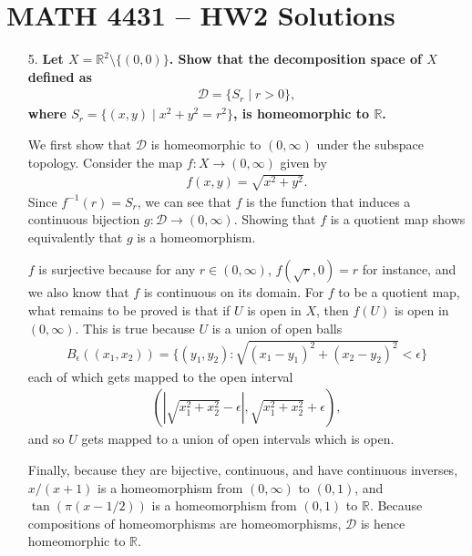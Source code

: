\documentclass[a4paper,12pt]{article}
\begin{document}
\section*{MATH 4431 -- HW2 Solutions}
\begin{enumerate}
    \item[5.]
        \boldmath\textbf{Let $X = \mathbb{R}^2 \setminus \{ (0, 0) \}$. Show that the decomposition space of $X$ defined as
            \begin{align*}
                \mathcal{D} = \{ S_r \mid r > 0 \},
            \end{align*}
            where $S_r = \{ (x, y) \mid x^2 + y^2 = r^2 \}$, is homeomorphic to $\mathbb{R}$.
        }\unboldmath \par
        We first show that $\mathcal{D}$ is homeomorphic to $(0, \infty)$ under the subspace topology. Consider the map $f : X \to (0, \infty)$ given by
        \begin{align*}
            f(x, y) = \sqrt{x^2 + y^2}.
        \end{align*}
        Since $f^{-1}(r) = S_r$, we can see that $f$ is the function that induces a continuous bijection $g : \mathcal{D} \to (0, \infty)$. Showing that $f$ is a quotient map shows equivalently that $g$ is a homeomorphism. \par 
        $f$ is surjective because for any $r \in (0, \infty)$, $f(\sqrt{r}, 0) = r$ for instance, and we also know that $f$ is continuous on its domain. For $f$ to be a quotient map, what remains to be proved is that if $U$ is open in $X$, then $f(U)$ is open in $(0, \infty)$. This is true because $U$ is a union of open balls
        \begin{align*}
            B_\epsilon((x_1, x_2)) = \{ (y_1, y_2) : \sqrt{(x_1 - y_1)^2 + (x_2 - y_2)^2} < \epsilon \}
        \end{align*}
        each of which gets mapped to the open interval
        \begin{align*}
            (|\sqrt{x_1^2 + x_2^2} - \epsilon|, \sqrt{x_1^2 + x_2^2} + \epsilon),
        \end{align*}
        and so $U$ gets mapped to a union of open intervals which is open. \par
        Finally, because they are bijective, continuous, and have continuous inverses, $x/(x + 1)$ is a homeomorphism from $(0, \infty)$ to $(0, 1)$, and $\tan(\pi(x - 1/2))$ is a homeomorphism from $(0, 1)$ to $\mathbb{R}$. Because compositions of homeomorphisms are homeomorphisms, $\mathcal{D}$ is hence homeomorphic to $\mathbb{R}$.


\end{enumerate}
\end{document}
